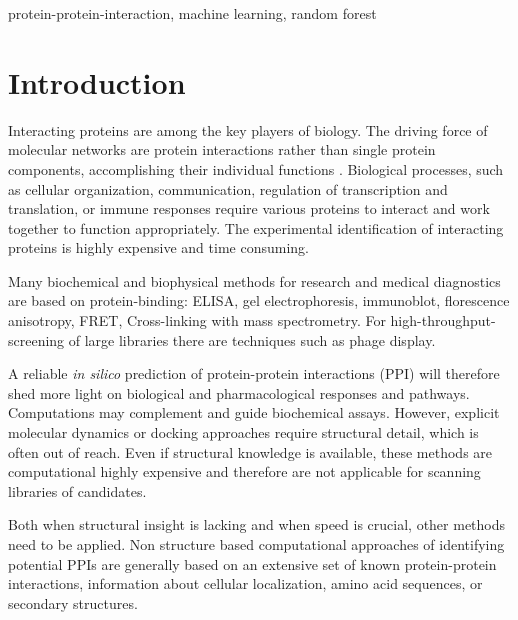 \documentclass[3p,times,twocolumn]{elsarticle}
\begin{document}
\begin{keyword}
  protein-protein-interaction, machine learning, random forest
\end{keyword}

\maketitle





\section{Introduction}

Interacting proteins are among the key players of biology. The driving
force of molecular networks are protein interactions rather than
single protein components, accomplishing their individual functions
\cite{Pawson:2004}. Biological processes, such as cellular
organization, communication, regulation of transcription and
translation, or immune responses require various proteins to interact
and work together to function appropriately. The experimental
identification of interacting proteins is highly expensive and time
consuming.

Many biochemical and biophysical methods for research and medical diagnostics are based on protein-binding:
ELISA,
gel electrophoresis, immunoblot, florescence anisotropy, FRET,
Cross-linking with mass spectrometry. For high-throughput-screening of
large libraries there are techniques such as phage display. 

A reliable \textit{in silico} prediction of protein-protein
interactions (PPI) will therefore shed more light on biological and
pharmacological responses and pathways. Computations may complement
and guide biochemical assays. However, explicit molecular dynamics or
docking approaches require structural detail, which is often out of
reach. Even if structural knowledge is available, these methods are
computational highly expensive and therefore are not applicable for
scanning libraries of candidates. 

Both when structural insight is lacking and when speed is crucial,
other methods need to be applied. Non structure based computational
approaches of identifying potential PPIs are generally based on an
extensive set of known protein-protein interactions, information about
cellular localization, amino acid sequences, or secondary structures.
\end{document}
